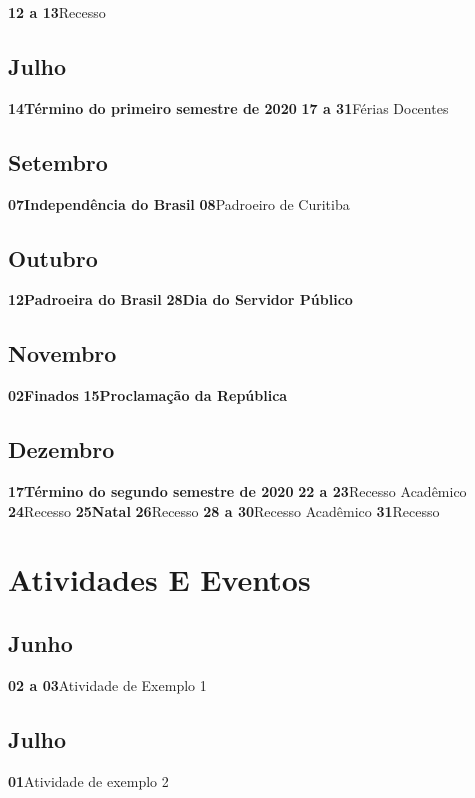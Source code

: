 \documentclass[thesis]{hmcposter}
\begin{document}
\begin{poster}
\newline\textbf{12 a 13}\quad \quad Recesso \newline\subsection{Julho}\textbf{14}\quad \quad \quad \quad \textbf{Término do primeiro semestre de 2020} \newline\textbf{17 a 31}\quad \quad Férias Docentes \newline\subsection{Setembro}\textbf{07}\quad \quad \quad \quad \textbf{Independência do Brasil} \newline\textbf{08}\quad \quad \quad \quad Padroeiro de Curitiba \newline\subsection{Outubro}\textbf{12}\quad \quad \quad \quad \textbf{Padroeira do Brasil} \newline\textbf{28}\quad \quad \quad \quad \textbf{Dia do Servidor Público} \newline\subsection{Novembro}\textbf{02}\quad \quad \quad \quad \textbf{Finados} \newline\textbf{15}\quad \quad \quad \quad \textbf{Proclamação da República} \newline\subsection{Dezembro}\textbf{17}\quad \quad \quad \quad \textbf{Término do segundo semestre de 2020} \newline\textbf{22 a 23}\quad \quad Recesso Acadêmico \newline\textbf{24}\quad \quad \quad \quad Recesso \newline\textbf{25}\quad \quad \quad \quad \textbf{Natal} \newline\textbf{26}\quad \quad \quad \quad Recesso \newline\textbf{28 a 30}\quad \quad Recesso Acadêmico \newline\textbf{31}\quad \quad \quad \quad Recesso \newline\newpage
\section{\color{hmcorange}Atividades E Eventos}\subsection{Junho}\textbf{02 a 03}\quad \quad Atividade de Exemplo 1 \newline\subsection{Julho}\textbf{01}\quad \quad \quad \quad Atividade de exemplo 2 \newline\end{poster}
\end{document}
